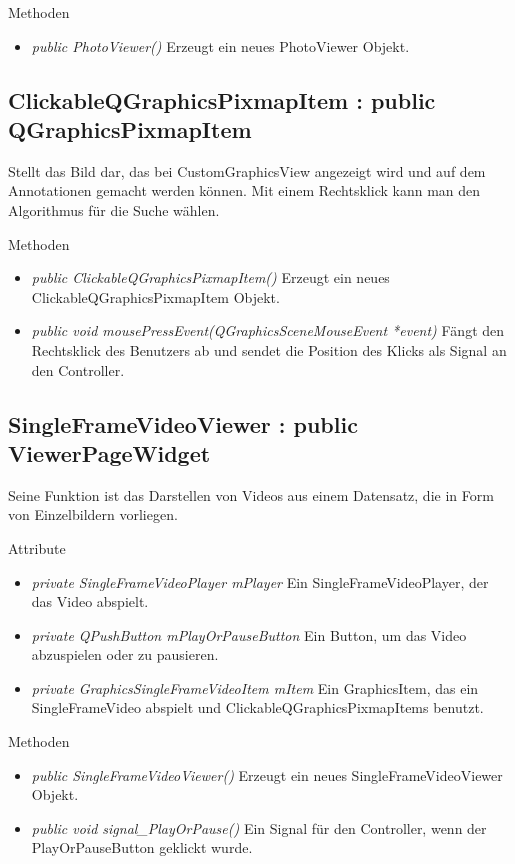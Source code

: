 Methoden
\begin{itemize}
	\item\textit{public PhotoViewer()} Erzeugt ein neues PhotoViewer Objekt.
\end{itemize}

\subsection*{ClickableQGraphicsPixmapItem : public QGraphicsPixmapItem}
Stellt das Bild dar, das bei CustomGraphicsView angezeigt wird und auf dem Annotationen gemacht werden können. Mit einem Rechtsklick kann man den Algorithmus für die Suche wählen.

Methoden
\begin{itemize}
	\item\textit{public ClickableQGraphicsPixmapItem()} Erzeugt ein neues ClickableQGraphicsPixmapItem Objekt.
	\item\textit{public void mousePressEvent(QGraphicsSceneMouseEvent *event)} Fängt den Rechtsklick des Benutzers ab und sendet die Position des Klicks als Signal an den Controller.
\end{itemize}

\subsection*{SingleFrameVideoViewer : public ViewerPageWidget}
Seine Funktion ist das Darstellen von Videos aus einem Datensatz, die in Form von Einzelbildern vorliegen.

Attribute
\begin{itemize}
	\item\textit{private SingleFrameVideoPlayer mPlayer} Ein SingleFrameVideoPlayer, der das Video abspielt. 
	\item\textit{private QPushButton mPlayOrPauseButton} Ein Button, um das Video abzuspielen oder zu pausieren.
	\item\textit{private GraphicsSingleFrameVideoItem mItem} Ein GraphicsItem, das ein SingleFrameVideo abspielt und ClickableQGraphicsPixmapItems benutzt.
\end{itemize}

Methoden
\begin{itemize}
	\item\textit{public SingleFrameVideoViewer()} Erzeugt ein neues SingleFrameVideoViewer Objekt.
	\item\textit{public void signal\_PlayOrPause()} Ein Signal für den Controller, wenn der PlayOrPauseButton geklickt wurde.
\end{itemize} 

